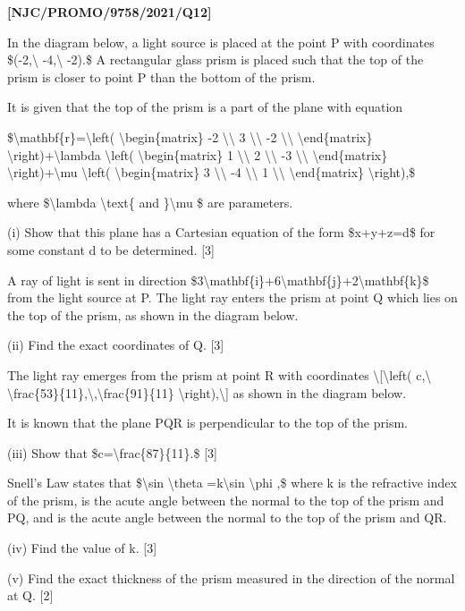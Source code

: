 \item \textbf{{[}NJC/PROMO/9758/2021/Q12{]}} 

In the diagram below, a light source is placed at the point P with
coordinates \$(-2,\textbackslash{} -4,\textbackslash{} -2).\$ A rectangular
glass prism is placed such that the top of the prism is closer to
point P than the bottom of the prism.

It is given that the top of the prism is a part of the plane with
equation

\$\textbackslash mathbf\{r\}=\textbackslash left( \textbackslash begin\{matrix\}
-2 \textbackslash\textbackslash{} 3 \textbackslash\textbackslash{}
-2 \textbackslash\textbackslash{} \textbackslash end\{matrix\}
\textbackslash right)+\textbackslash lambda \textbackslash left(
\textbackslash begin\{matrix\} 1 \textbackslash\textbackslash{}
2 \textbackslash\textbackslash{} -3 \textbackslash\textbackslash{}
\textbackslash end\{matrix\} \textbackslash right)+\textbackslash mu
\textbackslash left( \textbackslash begin\{matrix\} 3 \textbackslash\textbackslash{}
-4 \textbackslash\textbackslash{} 1 \textbackslash\textbackslash{}
\textbackslash end\{matrix\} \textbackslash right),\$

where \$\textbackslash lambda \textbackslash text\{ and \}\textbackslash mu
\$ are parameters.

(i) Show that this plane has a Cartesian equation of the form \$x+y+z=d\$
for some constant d to be determined. {[}3{]}

\quad{} A ray of light is sent in direction \$3\textbackslash mathbf\{i\}+6\textbackslash mathbf\{j\}+2\textbackslash mathbf\{k\}\$
from the light source at P. The light ray enters the prism at point
Q which lies on the top of the prism, as shown in the diagram below.

(ii) Find the exact coordinates of Q. {[}3{]}

The light ray emerges from the prism at point R with coordinates \textbackslash{[}\textbackslash left(
c,\textbackslash{} \textbackslash frac\{53\}\{11\},\textbackslash ,\textbackslash frac\{91\}\{11\}
\textbackslash right),\textbackslash{]} as shown in the diagram
below.

It is known that the plane PQR is perpendicular to the top of the
prism.

(iii) Show that \$c=\textbackslash frac\{87\}\{11\}.\$ {[}3{]}

Snell\textquoteright s Law states that \$\textbackslash sin \textbackslash theta
=k\textbackslash sin \textbackslash phi ,\$ where k is the refractive
index of the prism, is the acute angle between the normal to the top
of the prism and PQ, and is the acute angle between the normal to
the top of the prism and QR.

(iv) Find the value of k. {[}3{]}

(v) Find the exact thickness of the prism measured in the direction
of the normal at Q. {[}2{]}